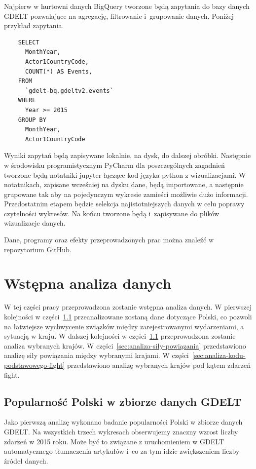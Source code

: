 \documentclass[11pt]{report}
\begin{document}
    Najpierw w hurtowni danych BigQuery tworzone będą zapytania do bazy danych GDELT pozwalające na agregację, filtrowanie i~grupowanie danych.
    Poniżej przykład zapytania.

    \begin{verbatim}
    SELECT
      MonthYear,
      Actor1CountryCode,
      COUNT(*) AS Events,
    FROM
      `gdelt-bq.gdeltv2.events`
    WHERE
      Year >= 2015
    GROUP BY
      MonthYear,
      Actor1CountryCode
    \end{verbatim}

    Wyniki zapytań będą zapisywane lokalnie, na dysk, do dalszej obróbki.
    Następnie w środowisku programistycznym PyCharm dla poszczególnych zagadnień tworzone będą notatniki jupyter łączące kod języka python z wizualizacjami.
    W notatnikach, zapisane wcześniej na dysku dane, będą importowane, a następnie grupowane tak aby na pojedynczym wykresie zamieści możliwie dużo informacji.
    Przedostatnim etapem będzie selekcja najistotniejszych danych w celu poprawy czytelności wykresów.
    Na końcu tworzone będą i~zapisywane do plików wizualizacje danych.

    Dane, programy oraz efekty przeprowadzonych prac można znaleźć w repozytorium \href{https://github.com/mijapa/GDELT}{GitHub}.


    \chapter{Wstępna analiza danych}\label{ch:wstępna-analiza-danych}
    W tej części pracy przeprowadzona zostanie wstępna analiza danych.
    W pierwszej kolejności w części~\ref{sec:popularność-polski-w-zbiorze-danych-gdelt} przeanalizowane zostaną dane dotyczące Polski, co pozwoli na łatwiejsze wychwycenie związków między zarejestrowanymi wydarzeniami, a sytuacją w kraju.
    W dalszej kolejności w części~\ref{sec:popularność-polski-w-zbiorze-danych-gdelt} przeprowadzona zostanie analiza wybranych krajów.
    W części~\ref{sec:analiza-siły-powiązania} przedstawiono analizę siły powiązania między wybranymi krajami.
    W części~\ref{sec:analiza-kodu-podstawowego-fight} przedstawiono analizę wybranych krajów pod kątem zdarzeń fight.


    \section{Popularność Polski w zbiorze danych GDELT}\label{sec:popularność-polski-w-zbiorze-danych-gdelt}
    Jako pierwszą analizę wykonano badanie popularności Polski w zbiorze danych GDELT. Na wszystkich trzech wykresach obserwujemy znaczny wzrost liczby zdarzeń w 2015 roku. Może być to związane z uruchomieniem w GDELT automatycznego tłumaczenia artykułów i~co za tym idzie zwiększeniem liczby źródeł danych.
\end{document}
